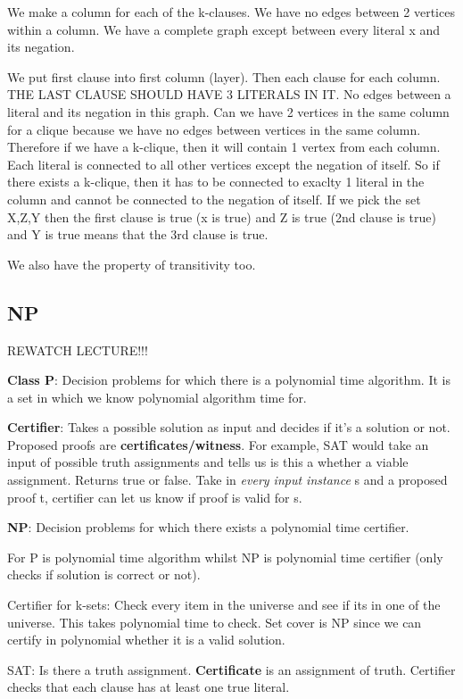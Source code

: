 \documentclass[11pt, oneside]{article}
\theoremstyle{definition}
\begin{document}
We make a column for each of the k-clauses. We have no edges between 2 vertices within a column. We have a complete graph except between every literal x and its negation.

We put first clause into first column (layer). Then each clause for each column. THE LAST CLAUSE SHOULD HAVE 3 LITERALS IN IT. No edges between a literal and its negation in this graph. Can we have 2 vertices in the same column for a clique because we have no edges between vertices in the same column. Therefore if we have a k-clique, then it will contain 1 vertex from each column. Each literal is connected to all other vertices except the negation of itself. So if there exists a k-clique, then it has to be connected to exaclty 1 literal in the column and cannot be connected to the negation of itself. If we pick the set X,Z,Y then the first clause is true (x is true) and Z is true (2nd clause is true) and Y is true means that the 3rd clause is true.

We also have the property of transitivity too.

\subsection{NP}
REWATCH LECTURE!!!

\textbf{Class P}: Decision problems for which there is a polynomial time algorithm. It is a set in which we know polynomial algorithm time for.

\textbf{Certifier}: Takes a possible solution as input and decides if it's a solution or not. Proposed proofs are \textbf{certificates/witness}. For example, SAT would take an input of possible truth assignments and tells us is this a whether a viable assignment. Returns true or false. Take in \textit{every input instance} s and a proposed proof t, certifier can let us know if proof is valid for s.

\textbf{NP}: Decision problems for which there exists a polynomial time certifier.

For P is polynomial time algorithm whilst NP is polynomial time certifier (only checks if solution is correct or not).

Certifier for k-sets: Check every item in the universe and see if its in one of the universe. This takes polynomial time to check. Set cover is NP since we can certify in polynomial whether it is a valid solution.

SAT: Is there a truth assignment. \textbf{Certificate} is an assignment of truth. Certifier checks that each clause has at least one true literal.
\end{document}
